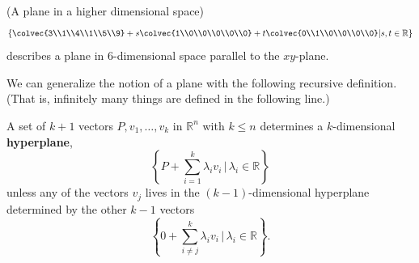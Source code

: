\begin{example}{(A plane in a higher dimensional space)} \label{2hyperplaneeg}
\[\left\{ \colvec{3\\1\\4\\1\\5\\9} + s\colvec{1\\0\\0\\0\\0\\0} + t\colvec{0\\1\\0\\0\\0\\0} \middle\arrowvert s, t \in \mathbb{R} \right\}\] describes a plane in 6-dimensional space parallel to the $xy$-plane.
\end{example}


\vspace{2mm}
We can generalize the notion of a plane with the following recursive definition. (That is, infinitely many things are defined in the following line.)

\begin{definition} A set of $k+1$ vectors $P,v_1, \ldots, v_k$ in $\mathbb{R}^n$ with $k\leq n$ determines a $k$-dimensional {\bfseries hyperplane}, 
\[
\left\{ P + \sum_{i=1}^{k} \lambda_iv_i\,  |\,  \lambda_i \in \mathbb{R} \right\}
\]
unless any of the vectors $v_j$ lives in the $(k-1)$-dimensional hyperplane determined by the other $k-1$ vectors
 \[
\left\{ 0 + \sum_{i\neq j}^{k} \lambda_iv_i\,  |\,  \lambda_i \in \mathbb{R} \right\}.
\]
\end{definition}


